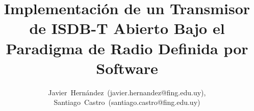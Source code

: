\documentclass[journal,comsoc]{IEEEtran}
\begin{document}
%
\title{Implementación de un Transmisor de ISDB-T Abierto Bajo el Paradigma de Radio Definida por Software}
%
%
%

\author{Javier~Hernández~(javier.hernandez@fing.edu.uy),
        Santiago~Castro~(santiago.castro@fing.edu.uy)}%

% 
%



% 
\end{document}
